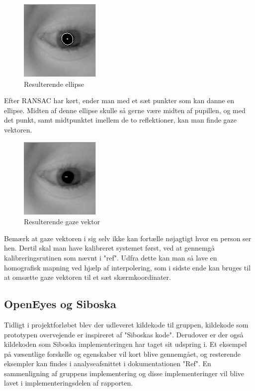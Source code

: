 \documentclass[rapport.tex]{subfiles}
\begin{document}
	\begin{figure}
	\centering
	\includegraphics[width=0.4\linewidth]{Billeder/Starburst,Ellipse.png}
	\caption{Resulterende ellipse}
	\label{fig:Starburst,Ellipse}
	\end{figure}
	
	Efter RANSAC har kørt, ender man med et sæt punkter som kan danne en ellipse. Midten af denne ellipse skulle så gerne være midten af pupillen, og med det punkt, samt midtpunktet imellem de to reflektioner, kan man finde gaze  vektoren.
	
	\begin{figure}
	\centering
	\includegraphics[width=0.4\linewidth]{Billeder/Starburst,Gaze.png}
	\caption{Resulterende gaze vektor}
	\label{fig:Starburst,Gaze}
	\end{figure}
	
	Bemærk at gaze vektoren i sig selv ikke kan fortælle nøjagtigt hvor en person ser hen. Dertil skal man have kalibreret systemet først, ved at gennemgå kalibreringsrutinen som nævnt i "ref". Udfra dette kan man så lave en homografisk mapning ved hjælp af interpolering, som i sidste ende kan bruges til at omsætte gaze vektoren til et sæt skærmkoordinater.
	
	\subsection{OpenEyes og Siboska}
	Tidligt i projektforløbet blev der udleveret kildekode til gruppen, kildekode som prototypen overvejende er inspireret af "Siboskas kode". Derudover er der også kildekoden som Siboska implementeringen har taget sit udspring i. Et eksempel på væsentlige forskelle og egenskaber vil kort blive gennemgået, og resterende eksempler kan findes i analyseafsnittet i dokumentationen "Ref". En sammenligning af gruppens implementering og disse implementeringer vil blive lavet i implementeringsdelen af rapporten.
	
\end{document}
